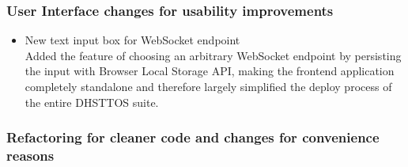 \documentclass[oneside, english, final]{design}
\begin{document}
\subsubsection{User Interface changes for usability improvements}
\begin{itemize}
  \item{New text input box for WebSocket endpoint
  \\
  Added the feature of choosing an arbitrary WebSocket endpoint by persisting the input with Browser Local Storage API, making the frontend application completely standalone and therefore largely simplified the deploy process of the entire DHSTTOS suite.}
  
\end{itemize}

\subsubsection{Refactoring for cleaner code and changes for convenience reasons}
\end{document}
